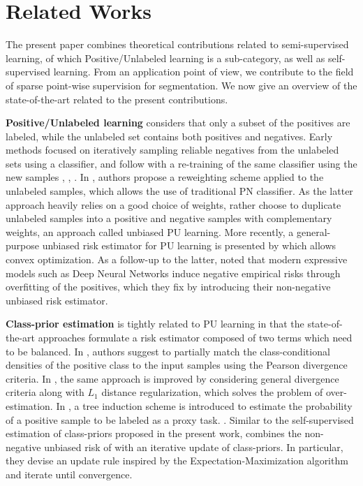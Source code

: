 \section{Related Works}
\label{sec:rel_works}

The present paper combines theoretical contributions related to semi-supervised learning, of which Positive/Unlabeled learning is a sub-category, as well as self-supervised learning.
From an application point of view, we contribute to the field of sparse point-wise supervision for segmentation.
We now give an overview of the state-of-the-art related to the present contributions.

\textbf{Positive/Unlabeled learning} considers that only a subset of the positives are labeled, while the unlabeled set contains both positives and negatives.
Early methods focused on iteratively sampling reliable negatives from the unlabeled sets using a classifier, and follow with a re-training of the same classifier using the new samples \cite{li03}, \cite{liu03}, \cite{li05}.
In \cite{lee03}, authors propose a reweighting scheme applied to the unlabeled samples, which allows the use of traditional PN classifier.
As the latter approach heavily relies on a good choice of weights, \cite{elkan08} rather choose to duplicate unlabeled samples into a positive and negative samples with complementary weights, an approach called unbiased PU learning.
More recently, a general-purpose unbiased risk estimator for PU learning is presented by \cite{duplessis15} which allows convex optimization.
As a follow-up to the latter, \cite{kiryo17} noted that modern expressive models such as Deep Neural Networks induce negative empirical risks through overfitting of the positives, which they fix by introducing their non-negative unbiased risk estimator.

\textbf{Class-prior estimation} is tightly related to PU learning in that the state-of-the-art approaches formulate a risk estimator composed of two terms which need to be balanced.
In \cite{duplessis14}, authors suggest to partially match the class-conditional densities of the positive class to the input samples using the Pearson divergence criteria. In \cite{christoffel16}, the same approach is improved by considering general divergence criteria along with $L_{1}$ distance regularization, which solves the problem of over-estimation.
In \cite{bekker18}, a tree induction scheme is introduced to estimate the probability of a positive sample to be labeled as a proxy task. \cite{scott09}.
Similar to the self-supervised estimation of class-priors proposed in the present work, \cite{kato18} combines the non-negative unbiased risk of \cite{kiryo17} with an iterative update of class-priors.
In particular, they devise an update rule inspired by the Expectation-Maximization algorithm and iterate until convergence.

